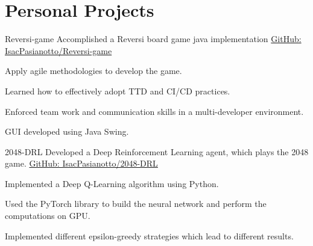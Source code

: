 \section{\textbf{Personal Projects}}
\resumeSubHeadingListStart
    \resumeProject
      {Reversi-game} %
      {Accomplished a Reversi board game java implementation} %
      {\href{https://github.com/IsacPasianotto/Reversi-game}{GitHub: IsacPasianotto/Reversi-game}}

      \resumeItemListStart
        \item {Apply agile methodologies to develop the game.}
        \item {Learned how to effectively adopt TTD and CI/CD practices.}
        \item {Enforced team work and communication skills in a multi-developer environment.}
        \item {GUI developed using Java Swing.}
    \resumeItemListEnd
    \vspace{-2mm}
    
    \resumeProject
      {2048-DRL}
      {Developed a Deep Reinforcement Learning agent, which plays the 2048 game.}
      {\href{https://github.com/IsacPasianotto/2048-DRL}{GitHub: IsacPasianotto/2048-DRL}}

      \resumeItemListStart
        \item {Implemented a Deep Q-Learning algorithm using Python.}
        \item {Used the PyTorch library to build the neural network and perform the computations on GPU.}
        \item {Implemented different epsilon-greedy strategies which lead to different results.}
    \resumeItemListEnd
    \vspace{-2mm}
    
  \resumeSubHeadingListEnd